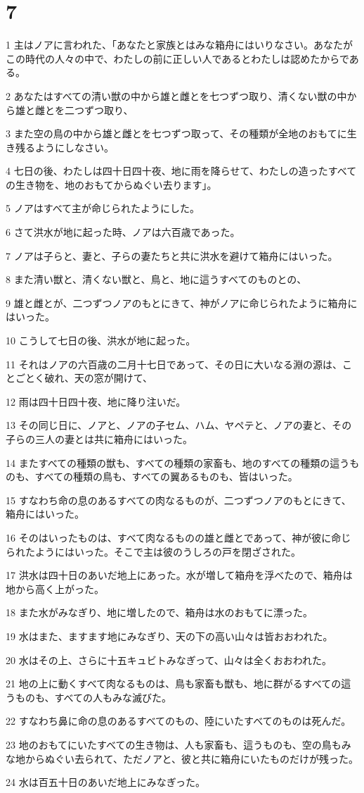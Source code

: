 \chapter{7}

\par 1 主はノアに言われた、「あなたと家族とはみな箱舟にはいりなさい。あなたがこの時代の人々の中で、わたしの前に正しい人であるとわたしは認めたからである。
\par 2 あなたはすべての清い獣の中から雄と雌とを七つずつ取り、清くない獣の中から雄と雌とを二つずつ取り、
\par 3 また空の鳥の中から雄と雌とを七つずつ取って、その種類が全地のおもてに生き残るようにしなさい。
\par 4 七日の後、わたしは四十日四十夜、地に雨を降らせて、わたしの造ったすべての生き物を、地のおもてからぬぐい去ります」。
\par 5 ノアはすべて主が命じられたようにした。
\par 6 さて洪水が地に起った時、ノアは六百歳であった。
\par 7 ノアは子らと、妻と、子らの妻たちと共に洪水を避けて箱舟にはいった。
\par 8 また清い獣と、清くない獣と、鳥と、地に這うすべてのものとの、
\par 9 雄と雌とが、二つずつノアのもとにきて、神がノアに命じられたように箱舟にはいった。
\par 10 こうして七日の後、洪水が地に起った。
\par 11 それはノアの六百歳の二月十七日であって、その日に大いなる淵の源は、ことごとく破れ、天の窓が開けて、
\par 12 雨は四十日四十夜、地に降り注いだ。
\par 13 その同じ日に、ノアと、ノアの子セム、ハム、ヤペテと、ノアの妻と、その子らの三人の妻とは共に箱舟にはいった。
\par 14 またすべての種類の獣も、すべての種類の家畜も、地のすべての種類の這うものも、すべての種類の鳥も、すべての翼あるものも、皆はいった。
\par 15 すなわち命の息のあるすべての肉なるものが、二つずつノアのもとにきて、箱舟にはいった。
\par 16 そのはいったものは、すべて肉なるものの雄と雌とであって、神が彼に命じられたようにはいった。そこで主は彼のうしろの戸を閉ざされた。
\par 17 洪水は四十日のあいだ地上にあった。水が増して箱舟を浮べたので、箱舟は地から高く上がった。
\par 18 また水がみなぎり、地に増したので、箱舟は水のおもてに漂った。
\par 19 水はまた、ますます地にみなぎり、天の下の高い山々は皆おおわれた。
\par 20 水はその上、さらに十五キュビトみなぎって、山々は全くおおわれた。
\par 21 地の上に動くすべて肉なるものは、鳥も家畜も獣も、地に群がるすべての這うものも、すべての人もみな滅びた。
\par 22 すなわち鼻に命の息のあるすべてのもの、陸にいたすべてのものは死んだ。
\par 23 地のおもてにいたすべての生き物は、人も家畜も、這うものも、空の鳥もみな地からぬぐい去られて、ただノアと、彼と共に箱舟にいたものだけが残った。
\par 24 水は百五十日のあいだ地上にみなぎった。

